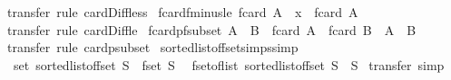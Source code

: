 \begin{isabellebody}
%
\isadelimproof
%
\endisadelimproof
%
\isatagproof
{}\isamarkupfalse%
\ transfer\ {\isacharparenleft}rule\ card{\isacharunderscore}Diff{}{\isacharunderscore}less{\isacharparenright}%
\endisatagproof
{\isafoldproof}%
%
\isadelimproof
\isanewline
%
\endisadelimproof
\isanewline
{}\isamarkupfalse%
\ fcard{\isacharunderscore}fminus{}{\isacharunderscore}le{\isacharcolon}\ {\isachardoublequoteopen}fcard\ {\isacharparenleft}A\ {\isacharbar}{\isacharminus}{\isacharbar}\ {\isacharbraceleft}{\isacharbar}x{\isacharbar}{\isacharbraceright}{\isacharparenright}\ {\isasymle}\ fcard\ A{\isachardoublequoteclose}\isanewline
%
\isadelimproof
%
\endisadelimproof
%
\isatagproof
{}\isamarkupfalse%
\ transfer\ {\isacharparenleft}rule\ card{\isacharunderscore}Diff{}{\isacharunderscore}le{\isacharparenright}%
\endisatagproof
{\isafoldproof}%
%
\isadelimproof
\isanewline
%
\endisadelimproof
\isanewline
{}\isamarkupfalse%
\ fcard{\isacharunderscore}pfsubset{\isacharcolon}\ {\isachardoublequoteopen}A\ {\isacharbar}{\isasymsubseteq}{\isacharbar}\ B\ {\isasymLongrightarrow}\ fcard\ A\ {\isacharless}\ fcard\ B\ {\isasymLongrightarrow}\ A\ {\isacharless}\ B{\isachardoublequoteclose}\isanewline
%
\isadelimproof
%
\endisadelimproof
%
\isatagproof
{}\isamarkupfalse%
\ transfer\ {\isacharparenleft}rule\ card{\isacharunderscore}psubset{\isacharparenright}%
\endisatagproof
{\isafoldproof}%
%
\isadelimproof
%
\endisadelimproof
%
\isadelimdocument
%
\endisadelimdocument
%
\isatagdocument
%
\isamarkuptrue%
%
\endisatagdocument
{\isafolddocument}%
%
\isadelimdocument
%
\endisadelimdocument
{}\isamarkupfalse%
\ sorted{\isacharunderscore}list{\isacharunderscore}of{\isacharunderscore}fset{\isacharunderscore}simps{\isacharbrackleft}simp{\isacharbrackright}{\isacharcolon}\isanewline
\ \ {\isachardoublequoteopen}set\ {\isacharparenleft}sorted{\isacharunderscore}list{\isacharunderscore}of{\isacharunderscore}fset\ S{\isacharparenright}\ {\isacharequal}\ fset\ S{\isachardoublequoteclose}\isanewline
\ \ {\isachardoublequoteopen}fset{\isacharunderscore}of{\isacharunderscore}list\ {\isacharparenleft}sorted{\isacharunderscore}list{\isacharunderscore}of{\isacharunderscore}fset\ S{\isacharparenright}\ {\isacharequal}\ S{\isachardoublequoteclose}\isanewline
%
\isadelimproof
%
\endisadelimproof
%
\isatagproof
{}\isamarkupfalse%
\ {\isacharparenleft}transfer{\isacharcomma}\ simp{\isacharparenright}{\isacharplus}%

\end{isabellebody}
